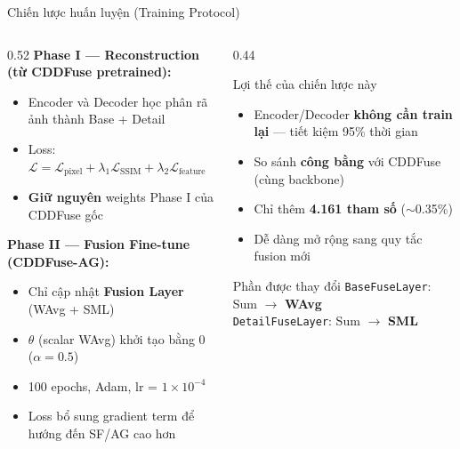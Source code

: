 \documentclass[t, aspectratio=169]{beamer}
\begin{document}
\begin{frame}{Chiến lược huấn luyện (Training Protocol)}
    \begin{columns}[T]
        \begin{column}{0.52\textwidth}
            \textbf{Phase I --- Reconstruction (từ CDDFuse pretrained):}
            \begin{itemize}\itemsep2pt\small
                \item Encoder và Decoder học phân rã ảnh thành Base + Detail
                \item Loss: $\mathcal{L} = \mathcal{L}_\text{pixel} + \lambda_1\mathcal{L}_\text{SSIM} + \lambda_2\mathcal{L}_\text{feature}$
                \item \textbf{Giữ nguyên} weights Phase I của CDDFuse gốc
            \end{itemize}
            \vspace{0.5em}
            \textbf{Phase II --- Fusion Fine-tune (CDDFuse-AG):}
            \begin{itemize}\itemsep2pt\small
                \item Chỉ cập nhật \textbf{Fusion Layer} (WAvg + SML)
                \item $\theta$ (scalar WAvg) khởi tạo bằng 0 ($\alpha = 0.5$)
                \item 100 epochs, Adam, lr = $1\times10^{-4}$
                \item Loss bổ sung gradient term để hướng đến SF/AG cao hơn
            \end{itemize}
        \end{column}
        \begin{column}{0.44\textwidth}
            \begin{block}{\small Lợi thế của chiến lược này}
                \small
                \begin{itemize}\itemsep3pt
                    \item Encoder/Decoder \textbf{không cần train lại} --- tiết kiệm 95\% thời gian
                    \item So sánh \textbf{công bằng} với CDDFuse (cùng backbone)
                    \item Chỉ thêm \textbf{4.161 tham số} ($\sim$0.35\%)
                    \item Dễ dàng mở rộng sang quy tắc fusion mới
                \end{itemize}
            \end{block}
            \vspace{0.3em}
            \begin{alertblock}{\small Phần được thay đổi}
                \centering\small \texttt{BaseFuseLayer}: Sum $\to$ \textbf{WAvg}\\
                \texttt{DetailFuseLayer}: Sum $\to$ \textbf{SML}
            \end{alertblock}
        \end{column}
    \end{columns}
\end{frame}
\end{document}
